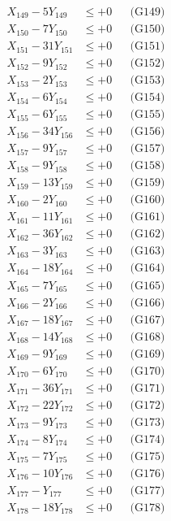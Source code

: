 \documentclass[a4paper,10pt]{article}
\begin{document}
{\begin{align}
X_{149} - 5Y_{149} &\leq +0 && \text{(G149)} \\
X_{150} - 7Y_{150} &\leq +0 && \text{(G150)} \\
X_{151} - 31Y_{151} &\leq +0 && \text{(G151)} \\
X_{152} - 9Y_{152} &\leq +0 && \text{(G152)} \\
X_{153} - 2Y_{153} &\leq +0 && \text{(G153)} \\
\allowbreak
X_{154} - 6Y_{154} &\leq +0 && \text{(G154)} \\
X_{155} - 6Y_{155} &\leq +0 && \text{(G155)} \\
X_{156} - 34Y_{156} &\leq +0 && \text{(G156)} \\
X_{157} - 9Y_{157} &\leq +0 && \text{(G157)} \\
X_{158} - 9Y_{158} &\leq +0 && \text{(G158)} \\
X_{159} - 13Y_{159} &\leq +0 && \text{(G159)} \\
X_{160} - 2Y_{160} &\leq +0 && \text{(G160)} \\
X_{161} - 11Y_{161} &\leq +0 && \text{(G161)} \\
X_{162} - 36Y_{162} &\leq +0 && \text{(G162)} \\
X_{163} - 3Y_{163} &\leq +0 && \text{(G163)} \\
\allowbreak
X_{164} - 18Y_{164} &\leq +0 && \text{(G164)} \\
X_{165} - 7Y_{165} &\leq +0 && \text{(G165)} \\
X_{166} - 2Y_{166} &\leq +0 && \text{(G166)} \\
X_{167} - 18Y_{167} &\leq +0 && \text{(G167)} \\
X_{168} - 14Y_{168} &\leq +0 && \text{(G168)} \\
X_{169} - 9Y_{169} &\leq +0 && \text{(G169)} \\
X_{170} - 6Y_{170} &\leq +0 && \text{(G170)} \\
X_{171} - 36Y_{171} &\leq +0 && \text{(G171)} \\
X_{172} - 22Y_{172} &\leq +0 && \text{(G172)} \\
X_{173} - 9Y_{173} &\leq +0 && \text{(G173)} \\
\allowbreak
X_{174} - 8Y_{174} &\leq +0 && \text{(G174)} \\
X_{175} - 7Y_{175} &\leq +0 && \text{(G175)} \\
X_{176} - 10Y_{176} &\leq +0 && \text{(G176)} \\
X_{177} - Y_{177} &\leq +0 && \text{(G177)} \\
X_{178} - 18Y_{178} &\leq +0 && \text{(G178)} \\

\end{align}}
\end{document}
